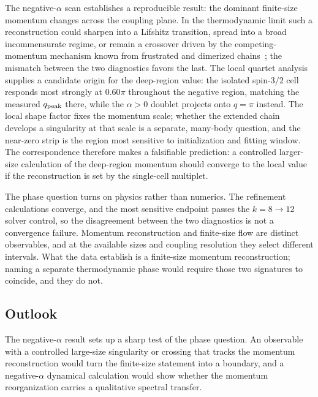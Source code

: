 The negative-$\alpha$ scan establishes a reproducible result: the dominant
finite-size momentum changes across the coupling plane.
In the thermodynamic limit such a reconstruction could sharpen into a Lifshitz
transition, spread into a broad incommensurate regime, or remain a crossover
driven by the competing-momentum mechanism known from frustrated and dimerized
chains~\cite{hida1992,chitra1995,hakobyan2001,white2008s1}; the mismatch between
the two diagnostics favors the last.
The local quartet analysis supplies a candidate origin for the deep-region value:
the isolated spin-$3/2$ cell responds most strongly at $0.60\pi$ throughout the
negative region, matching the measured $q_{\mathrm{peak}}$ there, while the
$\alpha>0$ doublet projects onto $q=\pi$ instead.
The local shape factor fixes the momentum scale; whether the extended chain
develops a singularity at that scale is a separate, many-body question, and the
near-zero strip is the region most sensitive to initialization and fitting window.
The correspondence therefore makes a falsifiable prediction: a controlled
larger-size calculation of the deep-region momentum should
converge to the local value if the reconstruction is set by the single-cell
multiplet.

The phase question turns on physics rather than numerics.
The refinement calculations converge, and the most sensitive endpoint passes the
$k=8\rightarrow12$ solver control, so the disagreement between the two
diagnostics is not a convergence failure.
Momentum reconstruction and finite-size flow are distinct observables, and at the
available sizes and coupling resolution they select different intervals.
What the data establish is a finite-size momentum reconstruction; naming a
separate thermodynamic phase would require those two signatures to coincide, and
they do not.

\subsection{Outlook}
\label{sec:remaining-tests}

The negative-$\alpha$ result sets up a sharp test of the phase question.
An observable with a controlled large-size singularity or crossing that tracks the
momentum reconstruction would turn the finite-size statement into a boundary, and a
negative-$\alpha$ dynamical calculation would show whether the momentum
reorganization carries a qualitative spectral transfer.

